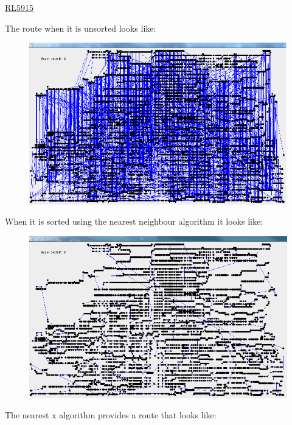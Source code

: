 \documentclass[conference,backref=page]{acmsiggraph}
\begin{document}
\underline{RL5915}

The route when it is unsorted looks like:

\begin{figure}[h]
\includegraphics[width=\columnwidth]{images/rl5915unsorted.png}
\end{figure}

When it is sorted using the nearest neighbour algorithm it looks like:
\begin{figure}[h]
	\includegraphics[width=\columnwidth]{images/rl5915nn.png}
\end{figure}

The nearest x algorithm provides a route that looks like:
\end{document}
